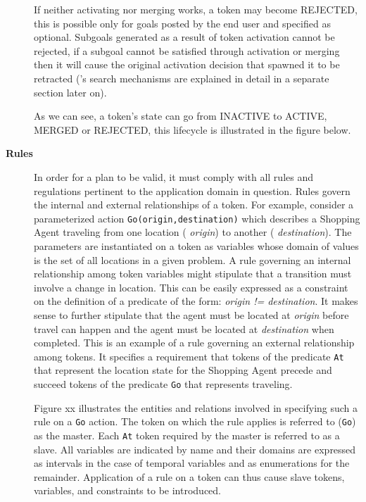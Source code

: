 \begin{description}

If neither activating nor merging works, a token may become REJECTED, this is possible only for goals posted by the end user and specified as optional. Subgoals generated as a result of token activation cannot be rejected, if a subgoal cannot be satisfied through activation or merging then it will cause the original activation decision that spawned it to be retracted (\eu's search mechanisms are explained in detail in a separate section later on).

As we can see, a token's state can go from INACTIVE to ACTIVE, MERGED or REJECTED, this lifecycle is illustrated in the figure below.


\item[\textbf{Rules}] In order for a plan to be valid, it must comply with all rules and
regulations pertinent to the application domain in question. Rules
govern the internal and external relationships of a token. For
example, consider a parameterized action \texttt{Go(origin,destination)} which describes
a Shopping Agent traveling from one location ( \textit{origin}) to another ( \textit{destination}). The
parameters are instantiated on a token as variables whose domain of
values is the set of all locations in a given problem. A rule
governing an internal relationship among token variables might
stipulate that a transition must involve a change in location. This
can be easily expressed as a constraint on the definition of a
predicate of the form: \textit{origin != destination}. It makes sense to further
stipulate that the agent must be located at  \textit{origin} before travel can happen
and the agent must be located at  \textit{destination} when completed. This is
an example of a rule governing an external relationship among
tokens. It specifies a requirement that tokens of the predicate
\texttt{At} that represent the location state for the Shopping Agent 
precede and succeed tokens of the predicate \texttt{Go} that represents traveling.


Figure xx illustrates the entities and relations involved in specifying
such a rule on a \texttt{Go} action. The token on which the rule applies
is referred to (\texttt{Go}) as the master. Each  \texttt{At} token required by the
master is referred to as a slave. All variables are indicated by name
and their domains are expressed as intervals in the case of temporal
variables and as enumerations for the remainder. Application of a rule
on a token can thus cause slave tokens, variables, and constraints to
be introduced.  


\end{description}
